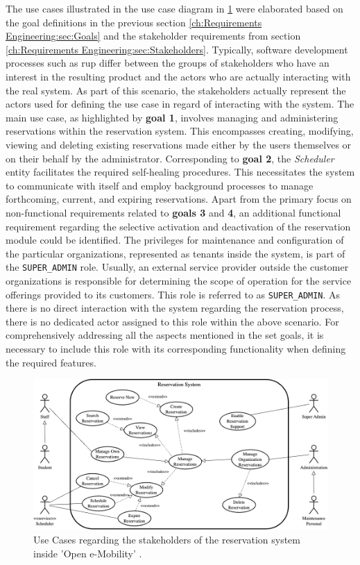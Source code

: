 The use cases illustrated in the use case diagram in \ref{fig:use-cases} were elaborated based on the goal definitions in the previous section \ref{ch:Requirements Engineering:sec:Goals} and the stakeholder requirements from section \ref{ch:Requirements Engineering:sec:Stakeholders}.
Typically, software development processes such as \acrshort{rup} \cite{kruchten_rational_1999} differ between the groups of stakeholders who have an interest in the resulting product and the actors who are actually interacting with the real system. 
As part of this scenario, the stakeholders actually represent the actors used for defining the use case in regard of interacting with the system.
The main use case, as highlighted by \textbf{goal 1}, involves managing and administering reservations within the reservation system. This encompasses creating, modifying, viewing and deleting existing reservations made either by the users themselves or on their behalf by the administrator.
Corresponding to \textbf{goal 2}, the \textit{Scheduler} entity facilitates the required self-healing procedures. This necessitates the system to communicate with itself and employ background processes to manage forthcoming, current, and expiring reservations.
Apart from the primary focus on non-functional requirements related to \textbf{goals 3} and \textbf{4}, an additional functional requirement regarding the selective activation and deactivation of the reservation module could be identified.
The privileges for maintenance and configuration of the particular organizations, represented as tenants inside the system, is part of the \verb|SUPER_ADMIN| role.
Usually, an external service provider outside the customer organizations is responsible for determining the scope of operation for the service offerings provided to its customers. This role is referred to as \verb|SUPER_ADMIN|. As there is no direct interaction with the system regarding the reservation process, there is no dedicated actor assigned to this role within the above scenario.
For comprehensively addressing all the aspects mentioned in the set goals, it is necessary to include this role with its corresponding functionality when defining the required features.

\begin{figure}[h]
    \centering
    \includegraphics[scale=0.4]{resources/images/main/2_requirements_engineering/UseCases.png}
    \caption{Use Cases regarding the stakeholders of the reservation system inside 'Open e-Mobility' \cite{noauthor_open_2023}.}
    \label{fig:use-cases}
\end{figure}
